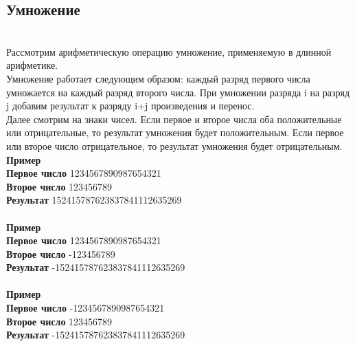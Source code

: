 \documentclass[a4paper]{article}
\begin{document}
\subsection{Умножение}
\\Рассмотрим арифметическую операцию умножение, применяемую в длинной арифметике.
\\Умножение работает следующим образом: каждый разряд первого числа умножается на каждый разряд второго числа. При умножении разряда i на разряд j добавим результат к разряду i+j произведения и перенос.
\\Далее смотрим на знаки чисел. Если первое и второе числа оба положительные или отрицательные, то результат умножения будет положительным. Если первое или второе число отрицательное, то результат умножения будет отрицательным.
\\ \textbf{Пример}
\\ \textbf{Первое число} 1234567890987654321
\\ \textbf{Второе число} 123456789
\\ \textbf{Результат} 152415787623837841112635269
\\
\\ \textbf{Пример}
\\ \textbf{Первое число} 1234567890987654321
\\ \textbf{Второе число} -123456789
\\ \textbf{Результат} -152415787623837841112635269
\\
\\ \textbf{Пример}
\\ \textbf{Первое число} -1234567890987654321
\\ \textbf{Второе число} 123456789
\\ \textbf{Результат} -152415787623837841112635269
\end{document}
